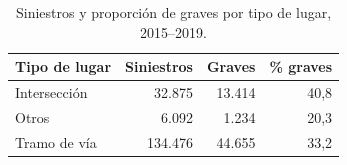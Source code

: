 \begin{table}[h]\centering\small
\caption{Siniestros y proporción de graves por tipo de lugar, 2015--2019.}\label{tab:lugar}
\begin{tabular}{lrrr}
\toprule
Tipo de lugar & Siniestros & Graves & \% graves \\
\midrule
Intersección & 32.875 & 13.414 & 40,8 \\
Otros & 6.092 & 1.234 & 20,3 \\
Tramo de vía & 134.476 & 44.655 & 33,2 \\
\bottomrule
\end{tabular}
\end{table}